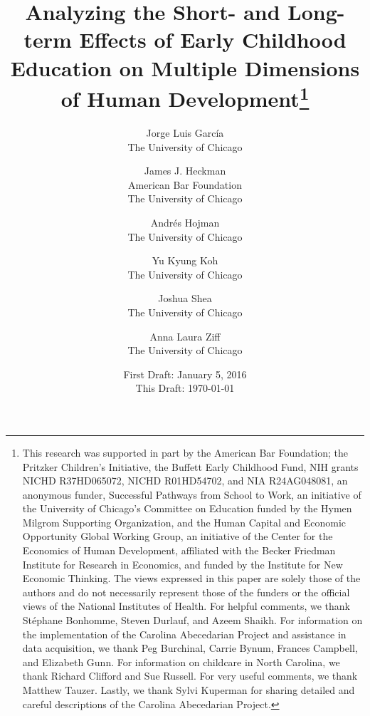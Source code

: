 




\title{\Large \textbf{Analyzing the Short- and Long-term Effects of Early Childhood Education on Multiple Dimensions of Human Development}\thanks{This research was supported in part by the American Bar Foundation; the Pritzker Children's Initiative, the
Buffett Early Childhood Fund, NIH grants NICHD R37HD065072, NICHD R01HD54702, and NIA R24AG048081, an
anonymous funder, Successful Pathways from School to Work, an initiative of the University of Chicago's Committee
on Education funded by the Hymen Milgrom Supporting Organization, and the Human Capital and Economic
Opportunity Global Working Group, an initiative of the Center for the Economics of Human Development, affiliated with
the Becker Friedman Institute for Research in Economics, and funded by the Institute for New Economic Thinking. The
views expressed in this paper are solely those of the authors and do not necessarily represent those of the funders or
the official views of the National Institutes of Health. For helpful comments, we thank St\'{e}phane Bonhomme, Steven Durlauf, and Azeem Shaikh. For information on the implementation of the Carolina Abecedarian Project and assistance in data acquisition, we thank Peg Burchinal, Carrie Bynum, Frances Campbell, and Elizabeth Gunn. For information on childcare in North Carolina, we thank Richard Clifford and Sue Russell. For very useful comments, we thank Matthew Tauzer. Lastly, we thank Sylvi Kuperman for sharing detailed and careful descriptions of the Carolina Abecedarian Project.}}

\author{
Jorge Luis Garc\'{i}a\\
The University of Chicago \and
James J. Heckman \\
American Bar Foundation \\
The University of Chicago \and
Andr\'{e}s Hojman\\
The University of Chicago \and
Yu Kyung Koh \\ 
The University of Chicago \and
Joshua Shea \\
The University of Chicago \and
Anna Laura Ziff \\ 
The University of Chicago}
\date{First Draft: January 5, 2016\\ This Draft: \today}
\maketitle

